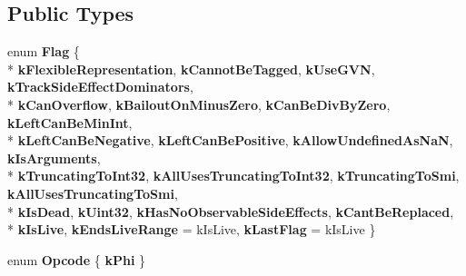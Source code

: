 \subsection*{Public Types}
\begin{DoxyCompactItemize}
\item 
\hypertarget{classv8_1_1internal_1_1_h_value_ad61d5dfb56d945f1ef7f245f78e9246b}{}enum {\bfseries Flag} \{ \\*
{\bfseries k\+Flexible\+Representation}, 
{\bfseries k\+Cannot\+Be\+Tagged}, 
{\bfseries k\+Use\+G\+V\+N}, 
{\bfseries k\+Track\+Side\+Effect\+Dominators}, 
\\*
{\bfseries k\+Can\+Overflow}, 
{\bfseries k\+Bailout\+On\+Minus\+Zero}, 
{\bfseries k\+Can\+Be\+Div\+By\+Zero}, 
{\bfseries k\+Left\+Can\+Be\+Min\+Int}, 
\\*
{\bfseries k\+Left\+Can\+Be\+Negative}, 
{\bfseries k\+Left\+Can\+Be\+Positive}, 
{\bfseries k\+Allow\+Undefined\+As\+Na\+N}, 
{\bfseries k\+Is\+Arguments}, 
\\*
{\bfseries k\+Truncating\+To\+Int32}, 
{\bfseries k\+All\+Uses\+Truncating\+To\+Int32}, 
{\bfseries k\+Truncating\+To\+Smi}, 
{\bfseries k\+All\+Uses\+Truncating\+To\+Smi}, 
\\*
{\bfseries k\+Is\+Dead}, 
{\bfseries k\+Uint32}, 
{\bfseries k\+Has\+No\+Observable\+Side\+Effects}, 
{\bfseries k\+Cant\+Be\+Replaced}, 
\\*
{\bfseries k\+Is\+Live}, 
{\bfseries k\+Ends\+Live\+Range} = k\+Is\+Live, 
{\bfseries k\+Last\+Flag} = k\+Is\+Live
 \}\label{classv8_1_1internal_1_1_h_value_ad61d5dfb56d945f1ef7f245f78e9246b}

\item 
\hypertarget{classv8_1_1internal_1_1_h_value_a823095afb3b6ca876edd3a259ff4088b}{}enum {\bfseries Opcode} \{ {\bfseries k\+Phi}
 \}\label{classv8_1_1internal_1_1_h_value_a823095afb3b6ca876edd3a259ff4088b}

\end{DoxyCompactItemize}
